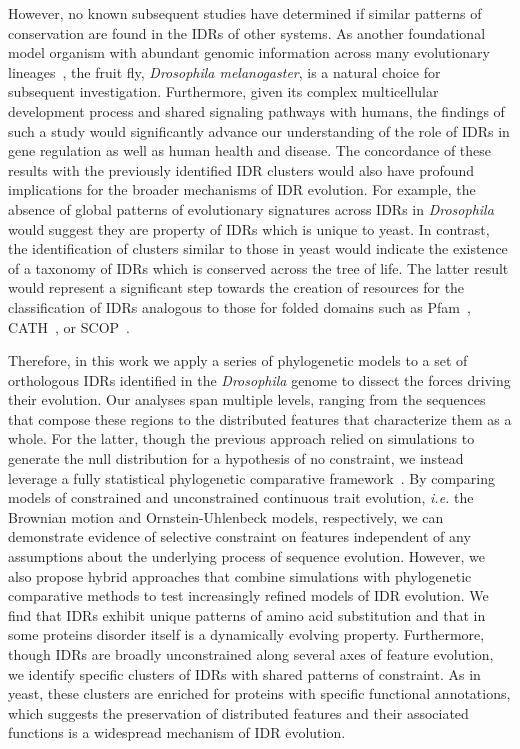 However, no known subsequent studies have determined if similar patterns of conservation are found in the IDRs of other systems. As another foundational model organism with abundant genomic information across many evolutionary lineages~\cite{Yang2018, Miller2018, Kim2021, Gramates2022}, the fruit fly, \textit{Drosophila melanogaster}, is a natural choice for subsequent investigation. Furthermore, given its complex multicellular development process and shared signaling pathways with humans, the findings of such a study would significantly advance our understanding of the role of IDRs in gene regulation as well as human health and disease. The concordance of these results with the previously identified IDR clusters would also have profound implications for the broader mechanisms of IDR evolution. For example, the absence of global patterns of evolutionary signatures across IDRs in \textit{Drosophila} would suggest they are property of IDRs which is unique to yeast. In contrast, the identification of clusters similar to those in yeast would indicate the existence of a taxonomy of IDRs which is conserved across the tree of life. The latter result would represent a significant step towards the creation of resources for the classification of IDRs analogous to those for folded domains such as Pfam~\cite{Mistry2020}, CATH~\cite{Sillitoe2020}, or SCOP~\cite{Andreeva2013, Andreeva2019}.

Therefore, in this work we apply a series of phylogenetic models to a set of orthologous IDRs identified in the \textit{Drosophila} genome to dissect the forces driving their evolution. Our analyses span multiple levels, ranging from the sequences that compose these regions to the distributed features that characterize them as a whole. For the latter, though the previous approach relied on simulations to generate the null distribution for a hypothesis of no constraint, we instead leverage a fully statistical phylogenetic comparative framework~\cite{Cornwell2017}. By comparing models of constrained and unconstrained continuous trait evolution, \textit{i.e.} the Brownian motion and Ornstein-Uhlenbeck models, respectively, we can demonstrate evidence of selective constraint on features independent of any assumptions about the underlying process of sequence evolution. However, we also propose hybrid approaches that combine simulations with phylogenetic comparative methods to test increasingly refined models of IDR evolution. We find that IDRs exhibit unique patterns of amino acid substitution and that in some proteins disorder itself is a dynamically evolving property. Furthermore, though IDRs are broadly unconstrained along several axes of feature evolution, we identify specific clusters of IDRs with shared patterns of constraint. As in yeast, these clusters are enriched for proteins with specific functional annotations, which suggests the preservation of distributed features and their associated functions is a widespread mechanism of IDR evolution.

